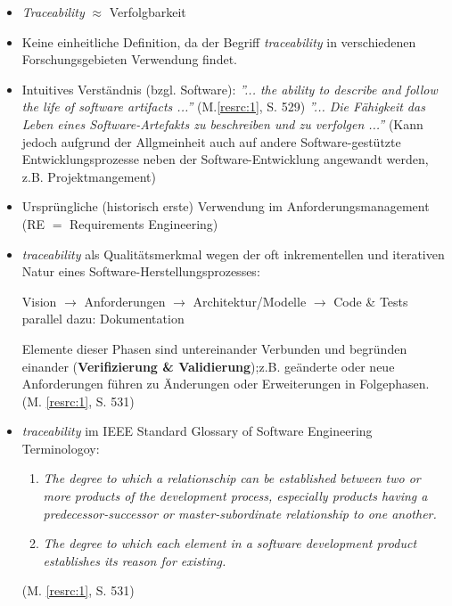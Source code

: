 \begin{itemize}

\item
\textit{Traceability} $\approx$ Verfolgbarkeit

\item
Keine einheitliche Definition, da der Begriff \textit{traceability} in verschiedenen Forschungsgebieten Verwendung findet.

\item
Intuitives Verständnis (bzgl. Software): 
\newline
\textit{''... the ability to describe and follow the life of
software artifacts ...''} (M.\ref{resrc:1}, S. 529)
\newline
\textit{''... Die Fähigkeit das Leben eines Software-Artefakts zu beschreiben und zu verfolgen ...''}
\newline
(Kann jedoch aufgrund der Allgmeinheit auch auf andere Software-gestützte Entwicklungsprozesse neben der Software-Entwicklung angewandt werden, z.B. Projektmangement)

\item
Ursprüngliche (historisch erste) Verwendung im Anforderungsmanagement (RE $=$ Requirements Engineering)

\item
\textit{traceability} als Qualitätsmerkmal wegen der oft inkrementellen und iterativen Natur eines Software-Herstellungsprozesses:
\begin{center}

Vision
$\rightarrow$
Anforderungen
$\rightarrow$
Architektur/Modelle
$\rightarrow$
Code \& Tests
\newline
parallel dazu: Dokumentation

\end{center}
Elemente dieser Phasen sind untereinander Verbunden und begründen einander (\textbf{Verifizierung \& Validierung});z.B. geänderte oder neue Anforderungen führen zu Änderungen oder Erweiterungen in Folgephasen. (M. \ref{resrc:1}, S. 531)

\item
\textit{traceability} im IEEE Standard Glossary of Software Engineering Terminologoy:
\begin{enumerate}
\item 
\textit{The degree to which a relationschip can be established between two or more products of the development process, especially products having a predecessor-successor or master-subordinate relationship to one another.}
\item
\textit{The degree to which each element in a software development product establishes its reason for existing.}
\end{enumerate}
(M. \ref{resrc:1}, S. 531)


\end{itemize}

